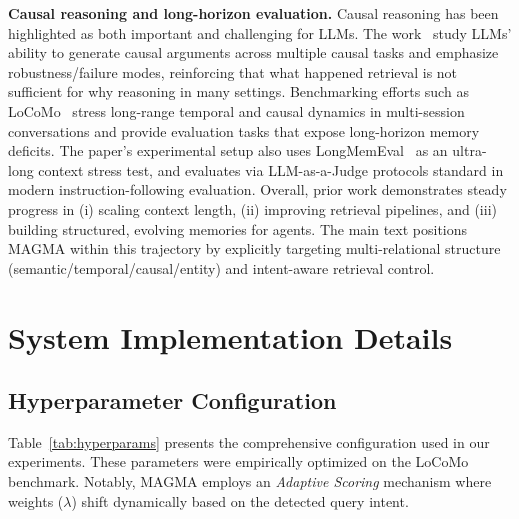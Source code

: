 \documentclass[11pt]{article}
\begin{document}
\textbf{Causal reasoning and long-horizon evaluation.} Causal reasoning has been highlighted as both important and challenging for LLMs. The work~\cite{kiciman2023causal} study LLMs’ ability to generate causal arguments across multiple causal tasks and emphasize robustness/failure modes, reinforcing that what happened retrieval is not sufficient for why reasoning in many settings. Benchmarking efforts such as LoCoMo~\cite{maharana2024evaluating} stress long-range temporal and causal dynamics in multi-session conversations and provide evaluation tasks that expose long-horizon memory deficits. The paper’s experimental setup also uses LongMemEval~\cite{wu2024longmemeval} as an ultra-long context stress test, and evaluates via LLM-as-a-Judge protocols standard in modern instruction-following evaluation. Overall, prior work demonstrates steady progress in (i) scaling context length, (ii) improving retrieval pipelines, and (iii) building structured, evolving memories for agents. The main text positions MAGMA within this trajectory by explicitly targeting multi-relational structure (semantic/temporal/causal/entity) and intent-aware retrieval control.

\section{System Implementation Details}
\label{app:impl}

\subsection{Hyperparameter Configuration}
Table~\ref{tab:hyperparams} presents the comprehensive configuration used in our experiments. These parameters were empirically optimized on the LoCoMo benchmark. Notably, MAGMA employs an \textit{Adaptive Scoring} mechanism where weights ($\lambda$) shift dynamically based on the detected query intent.
\end{document}
